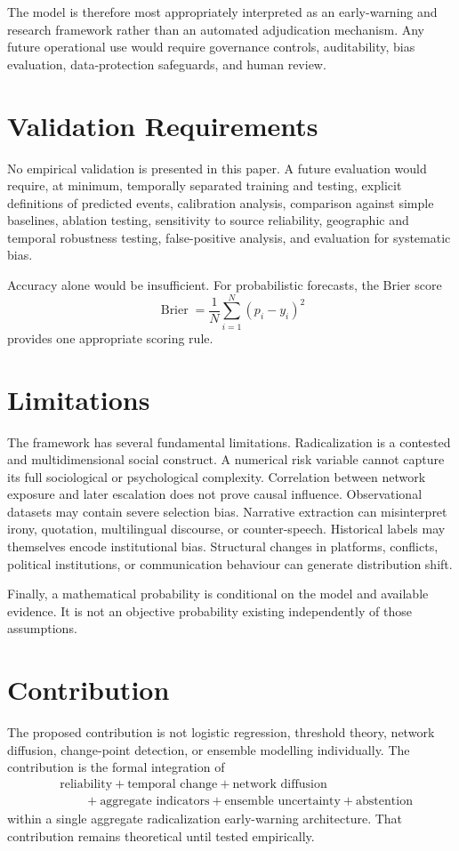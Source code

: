 \documentclass[11pt,letterpaper]{article}
\begin{document}
The model is therefore most appropriately interpreted as an early-warning and research framework rather than an automated adjudication mechanism. Any future operational use would require governance controls, auditability, bias evaluation, data-protection safeguards, and human review.

\section{Validation Requirements}
No empirical validation is presented in this paper. A future evaluation would require, at minimum, temporally separated training and testing, explicit definitions of predicted events, calibration analysis, comparison against simple baselines, ablation testing, sensitivity to source reliability, geographic and temporal robustness testing, false-positive analysis, and evaluation for systematic bias.

Accuracy alone would be insufficient. For probabilistic forecasts, the Brier score
\begin{equation}
\operatorname{Brier}=\frac{1}{N}\sum_{i=1}^{N}(p_i-y_i)^2
\end{equation}
provides one appropriate scoring rule.

\section{Limitations}
The framework has several fundamental limitations. Radicalization is a contested and multidimensional social construct. A numerical risk variable cannot capture its full sociological or psychological complexity. Correlation between network exposure and later escalation does not prove causal influence. Observational datasets may contain severe selection bias. Narrative extraction can misinterpret irony, quotation, multilingual discourse, or counter-speech. Historical labels may themselves encode institutional bias. Structural changes in platforms, conflicts, political institutions, or communication behaviour can generate distribution shift.

Finally, a mathematical probability is conditional on the model and available evidence. It is not an objective probability existing independently of those assumptions.

\section{Contribution}
The proposed contribution is not logistic regression, threshold theory, network diffusion, change-point detection, or ensemble modelling individually. The contribution is the formal integration of
\begin{equation}
\begin{aligned}
&\text{reliability}+\text{temporal change}+\text{network diffusion}\\
&\qquad+\text{aggregate indicators}+\text{ensemble uncertainty}+\text{abstention}
\end{aligned}
\end{equation}
within a single aggregate radicalization early-warning architecture. That contribution remains theoretical until tested empirically.
\end{document}
